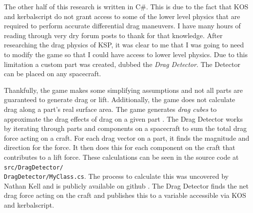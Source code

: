 \documentclass[journal,a4paper,12pt]{IEEEtran}
\begin{document}
The other half of this research is written in C\#. This is due to the fact that
KOS and kerbalscript do not grant access to some of the lower level physics that are required
to perform accurate differential drag maneuvers. I have many hours of reading through very
dry forum posts to thank for that knowledge.
After researching the drag physics of KSP, it was clear to me that I was going to
need to modify the game so that I could have access to lower level physics. Due to
this limitation a custom part was created, dubbed the \textit{Drag Detector}. The
Detector can be placed on any spacecraft.

Thankfully, the game makes some simplifying assumptions and not all parts are guaranteed to
generate drag or lift. Additionally, the game does not calculate drag along a part's
real surface area. The game generates \textit{drag cubes} to approximate the drag
effects of drag on a given part \cite{ksp_api}.
The Drag Detector works by iterating through
parts and components on a spacecraft to sum the total drag force acting on a craft.
For each drag vector on a part, it finds the magnitude and direction for the force.
It then does this for each component on the craft that contributes to a lift force.
These calculations can be seen in the source code at \texttt{src/DragDetector/\\DragDetector/MyClass.cs}.
The process to calculate this was uncovered by Nathan Kell and is publicly available
on github \cite{aero_gui}.
The Drag Detector finds the net drag force acting on the craft and publishes this to
a variable accessible via KOS and kerbalscript.
\end{document}
